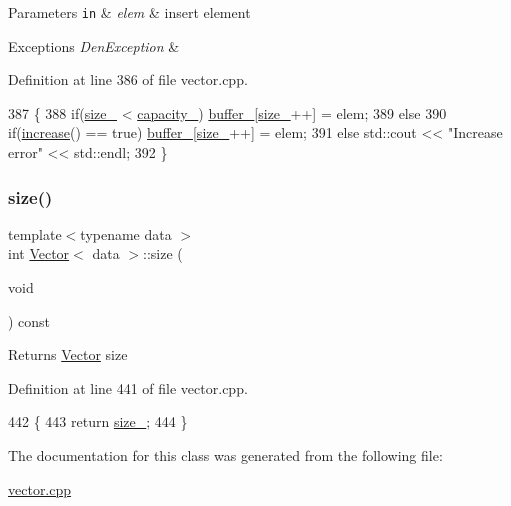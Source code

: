 \begin{DoxyParams}[1]{Parameters}
\mbox{\tt in}  & {\em elem} & insert element \\
\hline
\end{DoxyParams}

\begin{DoxyExceptions}{Exceptions}
{\em Den\+Exception} & \\
\hline
\end{DoxyExceptions}


Definition at line 386 of file vector.\+cpp.


\begin{DoxyCode}
387     \{
388         \textcolor{keywordflow}{if}(\hyperlink{classVector_a3c70fa478530a90177f2a7e7621ee688}{size\_} < \hyperlink{classVector_ad75911bb39018821f0e2911b6905b7ec}{capacity\_}) \hyperlink{classVector_a22db58ae9e92c6014e8ac657804a035a}{buffer\_}[\hyperlink{classVector_a3c70fa478530a90177f2a7e7621ee688}{size\_}++] = elem;
389         \textcolor{keywordflow}{else}
390             \textcolor{keywordflow}{if}(\hyperlink{classVector_afa2a3c5660a7a34794975a6bb80d175f}{increase}() == \textcolor{keyword}{true})  \hyperlink{classVector_a22db58ae9e92c6014e8ac657804a035a}{buffer\_}[\hyperlink{classVector_a3c70fa478530a90177f2a7e7621ee688}{size\_}++] = elem;
391             \textcolor{keywordflow}{else}                    std::cout << \textcolor{stringliteral}{"Increase error"} << std::endl;
392     \}
\end{DoxyCode}
\mbox{\label{classVector_a81b1d973485244101caf8e901b4a03d9}} 
\subsubsection{\texorpdfstring{size()}{size()}}
{\footnotesize\ttfamily template$<$typename data $>$ \\
int \hyperlink{classVector}{Vector}$<$ data $>$\+::size (\begin{DoxyParamCaption}\item[{void}]{ }\end{DoxyParamCaption}) const}

\begin{DoxyReturn}{Returns}
\hyperlink{classVector}{Vector} size 
\end{DoxyReturn}


Definition at line 441 of file vector.\+cpp.


\begin{DoxyCode}
442     \{
443         \textcolor{keywordflow}{return} \hyperlink{classVector_a3c70fa478530a90177f2a7e7621ee688}{size\_};
444     \}
\end{DoxyCode}


The documentation for this class was generated from the following file\+:\begin{DoxyCompactItemize}
\item 
\hyperlink{vector_8cpp}{vector.\+cpp}\end{DoxyCompactItemize}
